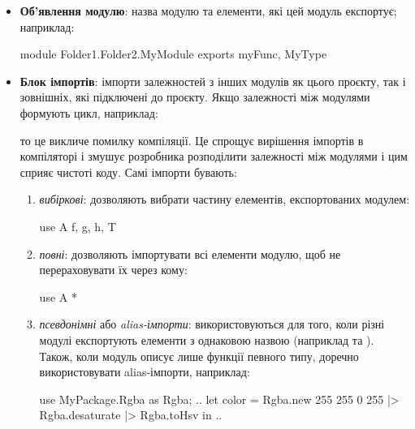 \begin{itemize}
    \item \textbf{Об'явлення модулю}: назва модулю та елементи, які цей модуль експортує; наприклад:
    \begin{xastcode}
        module Folder1.Folder2.MyModule exports { myFunc, MyType }
    \end{xastcode}
    \item \textbf{Блок імпортів}: імпорти залежностей з інших модулів як цього проєкту, так і зовнішніх, які підключені до проєкту. Якщо залежності між модулями формують цикл, наприклад:

    \begin{center}
    \end{center}

    то це викличе помилку компіляції. Це спрощує вирішення імпортів в компіляторі і змушує розробника розподілити залежності між модулями і цим сприяє чистоті коду. Самі імпорти бувають: \begin{enumerate}
        \item \textit{вибіркові}: дозволяють вибрати частину елементів, експортованих модулем:
        
        \begin{xastcode}
            use A { f, g, h, T }
        \end{xastcode}

        \item \textit{повні}: дозволяють імпортувати всі елементи модулю, щоб не перераховувати їх через кому:
        
        \begin{xastcode}
            use A *
        \end{xastcode}

        \item \textit{псевдонімні} або \textit{alias-імпорти}: використовуються для того, коли різні модулі експортують елементи з однаковою назвою (наприклад  та ). Також, коли модуль описує лише функції певного типу, доречно використовувати alias-імпорти, наприклад:
        
        \begin{xastcode}
use MyPackage.Rgba as Rgba;
..
let color = Rgba.new 255 255 0 255
    |> Rgba.desaturate
    |> Rgba.toHsv
in ..
        \end{xastcode}
    \end{enumerate} 


\end{itemize}
